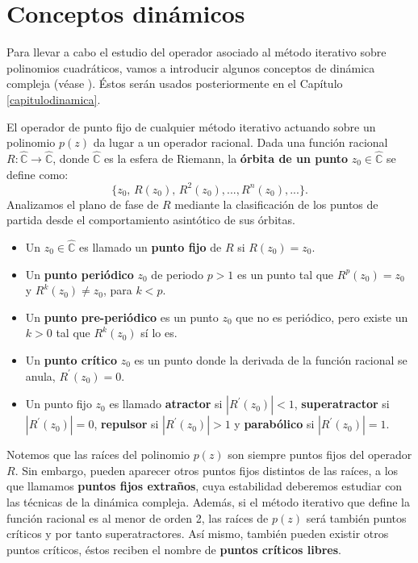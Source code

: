 \section{Conceptos dinámicos}
Para llevar a cabo el estudio del operador asociado al método iterativo sobre polinomios cuadráticos, vamos a introducir algunos conceptos de dinámica compleja (véase \cite{blanchard2}). Éstos serán usados posteriormente en el Capítulo \ref{capitulodinamica}.

El operador de punto fijo de cualquier método iterativo actuando sobre un polinomio $p(z)$ da lugar a un operador racional. Dada una función racional $R:\hat{\mathbb{C}}\rightarrow \hat{\mathbb{C}}$, donde $\hat{\mathbb{C}}$ es la esfera de Riemann, la \textbf{órbita de un punto} $z_{0} \in \hat{\mathbb{C}}$ se define como:
\[
\{ z_{0},\,R\left( z_{0}\right) ,\,R^{2}\left( z_{0}\right)
,...,R^{n}\left( z_{0}\right) ,...\}.
\]
Analizamos el plano de fase de $R$ mediante la clasificación de los
puntos de partida desde el comportamiento asintótico de sus órbitas.
\begin{itemize}
	\item Un $z_{0} \in \hat{\mathbb{C}}$ es llamado un \textbf{punto fijo} de $R$ si $R\left( z_{0}\right)=z_{0}$.
	\item Un \textbf{punto periódico} $z_{0}$ de
	periodo $p>1$ es un punto tal que $R^{p}\left( z_{0}\right) =z_{0}$
	y $R^{k}\left( z_{0}\right) \neq z_{0}$, para $k<p$.
	\item Un \textbf{punto pre-periódico} es un punto $z_{0}$ que no es periódico, pero existe un $k>0$ tal que $R^{k}\left( z_{0}\right) $ sí lo es.
	\item Un \textbf{punto crítico} $z_{0}$ es un punto donde la derivada de la función racional se anula, $R^{\prime }\left(
	z_{0}\right) =0$.
	\item Un punto fijo $z_{0}$ es llamado
	\textbf{atractor} si $|R^{\prime
	}(z_{0})|<1$,  \textbf{superatractor} si $|R^{\prime }(z_{0})|=0$, \textbf{repulsor} si $%
	|R^{\prime }(z_{0})|>1$ y \textbf{parabólico} si $|R^{\prime
	}(z_{0})|=1$.
\end{itemize}

Notemos que las raíces del polinomio $p(z)$ son siempre puntos fijos del operador $R$. Sin embargo, pueden aparecer otros puntos fijos distintos de las raíces, a los que llamamos \textbf{puntos fijos extraños}, cuya estabilidad deberemos estudiar con las técnicas de la dinámica compleja. Además, si el método iterativo que define la función racional es al menor de orden 2, las raíces de $p(z)$ será también puntos críticos y por tanto superatractores. Así mismo, también pueden existir otros puntos críticos, éstos reciben el nombre de \textbf{puntos críticos libres}.

